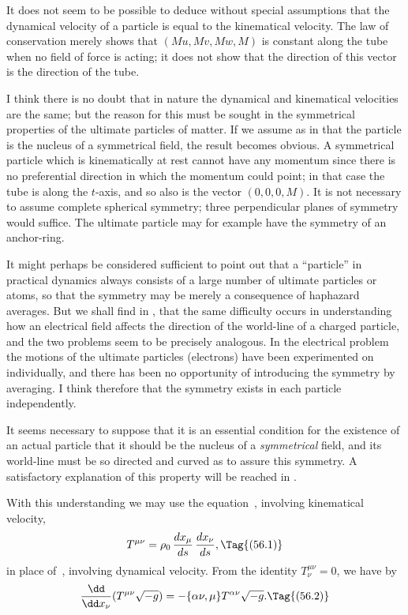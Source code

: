 \documentclass[12pt]{book}
\begin{document}
It does not seem to be possible to deduce without special assumptions that
the dynamical velocity of a particle is equal to the kinematical velocity. The
law of conservation merely shows that $(Mu, Mv, Mw, M)$ is constant along the
tube when no field of force is acting; it does not show that the direction of
this vector is the direction of the tube.

I think there is no doubt that in nature the dynamical and kinematical
velocities are the same; but the reason for this must be sought in the symmetrical
properties of the ultimate particles of matter. If we assume as in
 that the particle is the nucleus of a symmetrical field, the result becomes
obvious. A symmetrical particle which is kinematically at rest cannot have
any momentum since there is no preferential direction in which the momentum
could point; in that case the tube is along the $t$-axis, and so also is the vector
$(0, 0, 0, M)$. It is not necessary to assume complete spherical symmetry;
%
three perpendicular planes of symmetry would suffice. The ultimate particle
may for example have the symmetry of an anchor-ring.

It might perhaps be considered sufficient to point out that a ``particle'' in
practical dynamics always consists of a large number of ultimate particles or
atoms, so that the symmetry may be merely a consequence of haphazard
averages. But we shall find in , that the same difficulty occurs in understanding
how an electrical field affects the direction of the world-line of a
charged particle, and the two problems seem to be precisely analogous. In
the electrical problem the motions of the ultimate particles (electrons) have
been experimented on individually, and there has been no opportunity of
introducing the symmetry by averaging. I think therefore that the symmetry
exists in each particle independently.

It seems necessary to suppose that it is an essential condition for the
existence of an actual particle that it should be the nucleus of a \emph{symmetrical}
field, and its world-line must be so directed and curved as to assure this
symmetry. A satisfactory explanation of this property will be reached in .

With this understanding we may use the equation~, involving kinematical
velocity,
\[
T^{\mu\nu} = \rho_{0}\, \frac{dx_{\mu}}{ds}\, \frac{dx_{\nu}}{ds},
\Tag{(56.1)}
\]
in place of~, involving dynamical velocity. From the identity $T_{\nu}^{\mu\nu} = 0$, we
have by~
\[
\frac{\dd}{\dd x_{\nu}} (T^{\mu\nu} \sqrt{-g})
= -\{\alpha\nu, \mu\} T^{\alpha\nu} \sqrt{-g}.
\Tag{(56.2)}
\]
\end{document}
